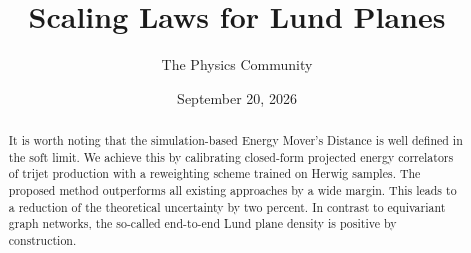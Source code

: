 \documentclass[11pt]{article}
\title{Scaling Laws for Lund Planes}
\author{The Physics Community}
\date{September 20, 2026}
\numberwithin{equation}{section}
\theoremstyle{definition}
\theoremstyle{remark}
\begin{document}
\maketitle
\begin{abstract}
It is worth noting that the simulation-based Energy Mover's Distance is
well defined in the soft limit. We achieve this by calibrating
closed-form projected energy correlators of trijet production with a
reweighting scheme trained on Herwig samples. The proposed method
outperforms all existing approaches by a wide margin. This leads to a
reduction of the theoretical uncertainty by two percent. In contrast to
equivariant graph networks, the so-called end-to-end Lund plane density
is positive by construction.
\end{abstract}
\tableofcontents



\nocite{*}


\end{document}
